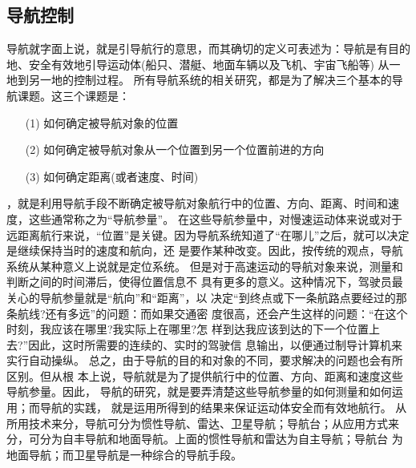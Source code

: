 \documentclass[UTF8,a4paper,10pt,nocolorlinks]{ctexart}
\begin{document}
        \subsection{导航控制}
        导航就字面上说，就是引导航行的意思，而其确切的定义可表述为：导航是有目的地、安全有效地引导运动体(船只、潜艇、地面车辆以及飞机、宇宙飞船等)
        从一地到另一地的控制过程。
        所有导航系统的相关研究，都是为了解决三个基本的导航课题。这三个课题是：
        \begin{itemize}
            \item [(1)] 
                如何确定被导航对象的位置
            \item [(2)]
                如何确定被导航对象从一个位置到另一个位置前进的方向
            \item [(3)]
                如何确定距离(或者速度、时间)
        \end{itemize}
        ，就是利用导航手段不断确定被导航对象航行中的位置、方向、距离、时间和速度，这些通常称之为“导航参量”。
        在这些导航参量中，对慢速运动体来说或对于远距离航行来说，“位置”是关键。因为导航系统知道了“在哪儿”之后，就可以决定是继续保持当时的速度和航向，还
    是要作某种改变。因此，按传统的观点，导航系统从某种意义上说就是定位系统。
但是对于高速运动的导航对象来说，测量和判断之间的时间滞后，使得位置信息不
具有更多的意义。这种情况下，驾驶员最关心的导航参量就是“航向”和“距离”，以
决定“到终点或下一条航路点要经过的那条航线?还有多远”的问题：而如果交通密
度很高，还会产生这样的问题：“在这个时刻，我应该在哪里?我实际上在哪里?怎
样到达我应该到达的下一个位置上去?”因此，这时所需要的连续的、实时的驾驶信
息输出，以便通过制导计算机来实行自动操纵。
总之，由于导航的目的和对象的不同，要求解决的问题也会有所区别。但从根
本上说，导航就是为了提供航行中的位置、方向、距离和速度这些导航参量。因此，
导航的研究，就是要弄清楚这些导航参量的如何测量和如何运用；而导航的实践，
就是运用所得到的结果来保证运动体安全而有效地航行。
从所用技术来分，导航可分为惯性导航、雷达、卫星导航；导航台；从应用方式来分，可分为自丰导航和地面导航。上面的惯性导航和雷达为自主导航；导航台
为地面导航；而卫星导航是一种综合的导航手段。
\end{document}
